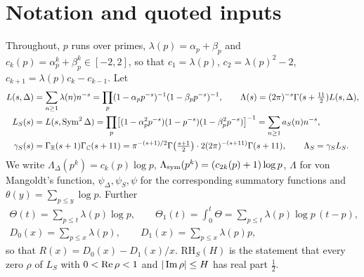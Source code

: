 \section{Notation and quoted inputs}\label{sec:notation}

Throughout, $p$ runs over primes, $\lambda(p)=\alpha_p+\beta_p$ and $c_k(p)=\alpha_p^k+\beta_p^k\in[-2,2]$, so that $c_1=\lambda(p)$, $c_2=\lambda(p)^2-2$, $c_{k+1}=\lambda(p)c_k-c_{k-1}$. Let
\begin{align*}
L(s,\Delta)&=\sum_{n\ge1}\lambda(n)n^{-s}=\prod_p(1-\alpha_pp^{-s})^{-1}(1-\beta_pp^{-s})^{-1},\qquad \Lambda(s)=(2\pi)^{-s}\Gamma(s+\tfrac{11}2)L(s,\Delta),\\
L_S(s)&=L(s,\operatorname{Sym}^2\Delta)=\prod_p\bigl[(1-\alpha_p^2p^{-s})(1-p^{-s})(1-\beta_p^2p^{-s})\bigr]^{-1}=\sum_{n\ge1}a_S(n)n^{-s},\\
\gamma_S(s)&=\Gamma_{\mathbb R}(s+1)\Gamma_{\mathbb C}(s+11)=\pi^{-(s+1)/2}\Gamma\bigl(\tfrac{s+1}2\bigr)\cdot2(2\pi)^{-(s+11)}\Gamma(s+11),\qquad \Lambda_S=\gamma_SL_S .
\end{align*}
We write $\Lambda_\Delta(p^k)=c_k(p)\log p$, $\Lambda_{\rm sym}(p^k)=(c_{2k}(p)+1)\log p$, $\Lambda$ for von Mangoldt's function, $\psi_\Delta,\psi_S,\psi$ for the corresponding summatory functions and $\theta(y)=\sum_{p\le y}\log p$. Further
\[
\begin{gathered}\Theta(t)=\sum_{p\le t}\lambda(p)\log p,\qquad \Theta_1(t)=\int_0^t\Theta=\sum_{p\le t}\lambda(p)\log p\,(t-p),\\ D_0(x)=\sum_{p\le x}\lambda(p),\qquad D_1(x)=\sum_{p\le x}\lambda(p)p,\end{gathered}
\]
so that $R(x)=D_0(x)-D_1(x)/x$. $\mathrm{RH}_S(H)$ is the statement that every zero $\rho$ of $L_S$ with $0<\operatorname{Re}\rho<1$ and $|\operatorname{Im}\rho|\le H$ has real part $\frac12$.

